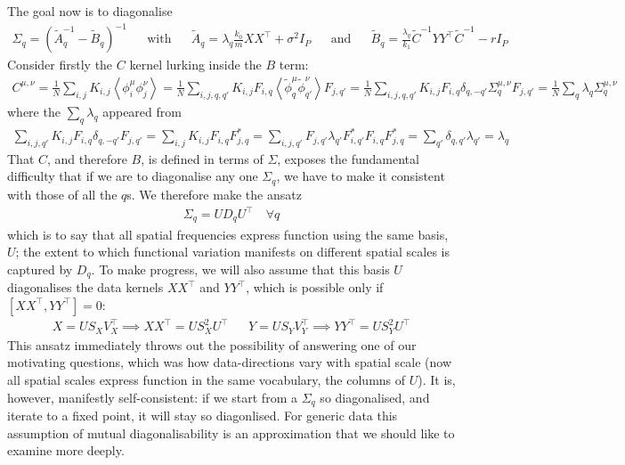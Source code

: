 \documentclass[../main.tex]{subfiles}
\begin{document}
The goal now is to diagonalise
\begin{align*}
    \Sigma_q = \left( \tilde A_q^{-1} - \tilde B_q \right)^{-1} 
    &&
    \text{with}
    &&
    \tilde A_q = \lambda_q \frac{k_0}{m} X X^{\top} + \sigma^2 I_P
    &&
    \text{and}
    &&
    \tilde B_q = \frac{\lambda_q}{k_1} \tilde C^{-1} Y Y^{\top} \tilde C^{-1} - r I_P
\end{align*}
Consider firstly the $C$ kernel lurking inside the $B$ term:
\begin{align*}
    C^{\mu,\nu}
    =
    \frac1N \sum_{i,j} K_{i,j} \left \langle \phi^{\mu}_i \phi^{\nu}_j \right \rangle
    =
    \frac1N \sum_{i,j,q,q'} K_{i,j} F_{i,q} \left \langle \tilde \phi^{\mu}_q \tilde \phi^{\nu}_{q'} \right \rangle F_{j, q'}
    =
    \frac1N \sum_{i,j,q,q'} K_{i,j} F_{i,q} \delta_{q,-q'} \Sigma^{\mu,\nu}_q F_{j, q'}
    =
    \frac1N \sum_q \lambda_q \Sigma^{\mu,\nu}_q
\end{align*}
where the $\sum_q \lambda_q$ appeared from
\begin{align*}
    \sum_{i,j,q'} K_{i,j} F_{i,q} \delta_{q,-q'} F_{j,q'} 
    =
    \sum_{i,j} K_{i,j} F_{i,q} F^*_{j,q}
    =
    \sum_{i,j,q'} F_{j,q'} \lambda_{q'} F^*_{i,q'} F_{i,q} F^*_{j,q}
    =
    \sum_{q'} \delta_{q,q'} \lambda_{q'}
    =
    \lambda_q
\end{align*}
That $C$, and therefore $B$, is defined in terms of $\Sigma$, exposes the fundamental difficulty that if we are to diagonalise any one $\Sigma_q$, we have to make it consistent with those of all the $q$s.
We therefore make the ansatz
\begin{align*}
    \Sigma_q = U D_q U^{\top} \quad \forall q
\end{align*}
which is to say that all spatial frequencies express function using the same basis, $U$; the extent to which functional variation manifests on different spatial scales is captured by $D_q$.
To make progress, we will also assume that this basis $U$ diagonalises the data kernels $XX^{\top}$ and $Y Y^{\top}$, which is possible only if $[XX^{\top}, YY^{\top}] = 0$:
\begin{align*}
    X = U S_X V_X^{\top}
    \implies
    XX^{\top} = U S_X^2 U^{\top}
    &&
    Y = U S_Y V_Y^{\top}
    \implies
    YY^{\top} = U S_Y^2 U^{\top}
\end{align*}
This ansatz immediately throws out the possibility of answering one of our motivating questions, which was how data-directions vary with spatial scale (now all spatial scales express function in the same vocabulary, the columns of $U$). It is, however, manifestly self-consistent: if we start from a $\Sigma_q$ so diagonalised, and iterate to a fixed point, it will stay so diagonlised. For generic data this assumption of mutual diagonalisability is an approximation that we should like to examine more deeply.
\end{document}
